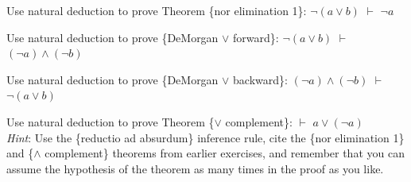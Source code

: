 {{\begin{ExerciseList}
\Exercise
Use natural deduction to prove
Theorem \{nor elimination 1\}: $\neg (a \vee b)$ $\vdash$ $\neg a$

\Exercise
Use natural deduction to prove \{DeMorgan $\vee$ forward\}:
$\neg (a \vee b)$ $\vdash$ $(\neg a) \wedge (\neg b)$

\Exercise
Use natural deduction to prove \{DeMorgan $\vee$ backward\}:
$(\neg a) \wedge (\neg b)$ $\vdash$ $\neg (a \vee b)$

\Exercise
Use natural deduction to prove
Theorem \{$\vee$ complement\}: $\vdash$ $a \vee (\neg a)$ \\
\emph{Hint}: Use the \{reductio ad absurdum\} inference rule,
cite the \{nor elimination 1\} and \{$\wedge$ complement\}
theorems from earlier exercises,
and remember that you can assume the hypothesis
of the theorem as many times in the proof as you like.

\end{ExerciseList}



}}

